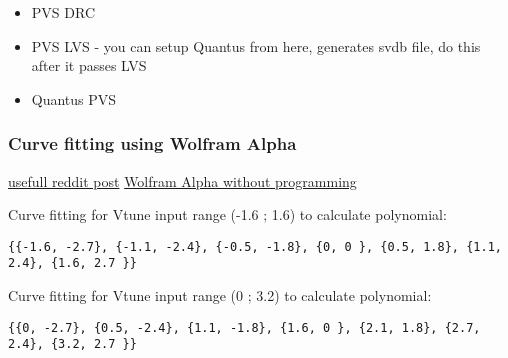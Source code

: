 \begin{itemize}
	\item PVS DRC 
	\item PVS LVS - you can setup Quantus from here, generates svdb file, do this after it passes LVS
	\item Quantus PVS 
\end{itemize}


\subsubsection*{Curve fitting using Wolfram Alpha}

\href{https://www.reddit.com/r/arduino/comments/12b7t9p/hello_everyone_im_trying_to_get_the_polynomial/}{usefull reddit post}
\href{https://www.wolframalpha.com/input?i=curve+fitting}{Wolfram Alpha without programming}

Curve fitting for Vtune input range (-1.6 ; 1.6) to calculate polynomial:

\begin{verbatim}
{{-1.6, -2.7}, {-1.1, -2.4}, {-0.5, -1.8}, {0, 0 }, {0.5, 1.8}, {1.1, 2.4}, {1.6, 2.7 }}	
\end{verbatim}
Curve fitting for Vtune input range (0 ; 3.2) to calculate polynomial:
\begin{verbatim}
{{0, -2.7}, {0.5, -2.4}, {1.1, -1.8}, {1.6, 0 }, {2.1, 1.8}, {2.7, 2.4}, {3.2, 2.7 }}		
\end{verbatim}
